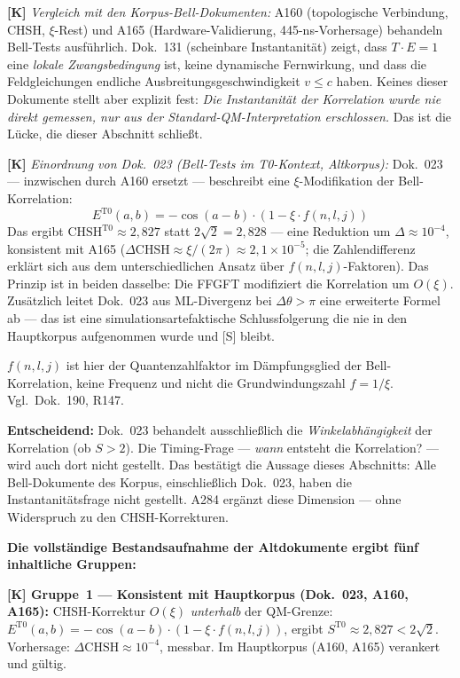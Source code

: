\textbf{[K]} \emph{Vergleich mit den Korpus-Bell-Dokumenten:}
A160 (topologische Verbindung, CHSH, $\xi$-Rest) und A165 (Hardware-Validierung, 445-ns-Vorhersage) behandeln Bell-Tests ausführlich. Dok.~131 (scheinbare Instantanität) zeigt, dass $T \cdot E = 1$ eine \emph{lokale Zwangsbedingung} ist, keine dynamische Fernwirkung, und dass die Feldgleichungen endliche Ausbreitungsgeschwindigkeit $v \le c$ haben. Keines dieser Dokumente stellt aber explizit fest: \emph{Die Instantanität der Korrelation wurde nie direkt gemessen, nur aus der Standard-QM-Interpretation erschlossen.} Das ist die Lücke, die dieser Abschnitt schließt.

\textbf{[K]} \emph{Einordnung von Dok.~023 (Bell-Tests im T0-Kontext, Altkorpus):}
Dok.~023 --- inzwischen durch A160 ersetzt --- beschreibt eine $\xi$-Modifikation der Bell-Korrelation:
\[
  E^{\mathrm{T0}}(a,b) = -\cos(a-b)\cdot(1-\xi\cdot f(n,l,j))
\]
Das ergibt $\mathrm{CHSH}^{\mathrm{T0}} \approx 2{,}827$ statt $2\sqrt{2} = 2{,}828$ --- eine Reduktion um $\Delta \approx 10^{-4}$, konsistent mit A165 ($\Delta\mathrm{CHSH} \approx \xi/(2\pi) \approx 2{,}1\times10^{-5}$; die Zahlendifferenz erklärt sich aus dem unterschiedlichen Ansatz über $f(n,l,j)$-Faktoren). Das Prinzip ist in beiden dasselbe: Die FFGFT modifiziert die Korrelation um $O(\xi)$. Zusätzlich leitet Dok.~023 aus ML-Divergenz bei $\Delta\theta > \pi$ eine erweiterte Formel ab --- das ist eine simulationsartefaktische Schlussfolgerung die nie in den Hauptkorpus aufgenommen wurde und [S] bleibt.

$f(n,l,j)$ ist hier der Quantenzahlfaktor im Dämpfungsglied der Bell-Korrelation, keine Frequenz und nicht die Grundwindungszahl $f = 1/\xi$. Vgl.\ Dok.~190, R147.

\textbf{Entscheidend:} Dok.~023 behandelt ausschließlich die \emph{Winkelabhängigkeit} der Korrelation (ob $S > 2$). Die Timing-Frage --- \emph{wann} entsteht die Korrelation? --- wird auch dort nicht gestellt. Das bestätigt die Aussage dieses Abschnitts: Alle Bell-Dokumente des Korpus, einschließlich Dok.~023, haben die Instantanitätsfrage nicht gestellt. A284 ergänzt diese Dimension --- ohne Widerspruch zu den CHSH-Korrekturen.

\textbf{Die vollständige Bestandsaufnahme der Altdokumente ergibt fünf inhaltliche Gruppen:}

\textbf{[K] Gruppe~1 --- Konsistent mit Hauptkorpus (Dok.~023, A160, A165):}
CHSH-Korrektur $O(\xi)$ \emph{unterhalb} der QM-Grenze:
$E^{\mathrm{T0}}(a,b) = -\cos(a-b)\cdot(1-\xi\cdot f(n,l,j))$,
ergibt $S^{\mathrm{T0}} \approx 2{,}827 < 2\sqrt{2}$.
Vorhersage: $\Delta\mathrm{CHSH} \approx 10^{-4}$, messbar.
Im Hauptkorpus (A160, A165) verankert und gültig.

